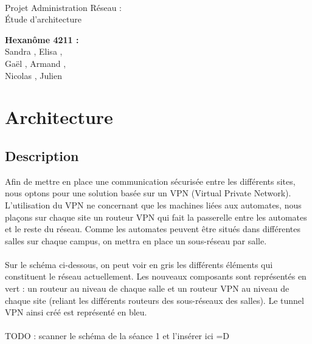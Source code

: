 \documentclass[a4paper]{article}
\begin{document}
\begin{titlepage}
	~ 
	\vfill
	\begin{center}
		\begin{Huge}
			Projet Administration Réseau : \\ Étude d'architecture\\
		\end{Huge}
	\vfill
		\textbf{Hexanôme 4211 :} 
			\\Sandra {}, Elisa , 
			\\Gaël , Armand , 
			\\Nicolas {}, Julien \\
	\vfill
	\end{center}
	\vfill
\end{titlepage}

\newpage
\tableofcontents
\newpage

\section{Architecture}
	\subsection{Description} %
	Afin de mettre en place une communication sécurisée entre les différents sites, nous optons pour une solution basée sur un VPN (Virtual Private Network). L'utilisation du VPN ne concernant que les machines liées aux automates, nous plaçons sur chaque site un routeur VPN qui fait la passerelle entre les automates et le reste du réseau. Comme les automates peuvent être situés dans différentes salles sur chaque campus, on mettra en place un sous-réseau par salle. 
	\paragraph*{}
	Sur le schéma ci-dessous, on peut voir en gris les différents éléments qui constituent le réseau actuellement. Les nouveaux composants sont représentés en vert : un routeur au niveau de chaque salle et un routeur VPN au niveau de chaque site (reliant les différents routeurs des sous-réseaux des salles). Le tunnel VPN ainsi créé est représenté en bleu. 
	\paragraph*{}
	TODO : scanner le schéma de la séance 1 et l'insérer ici =D 
\end{document}
